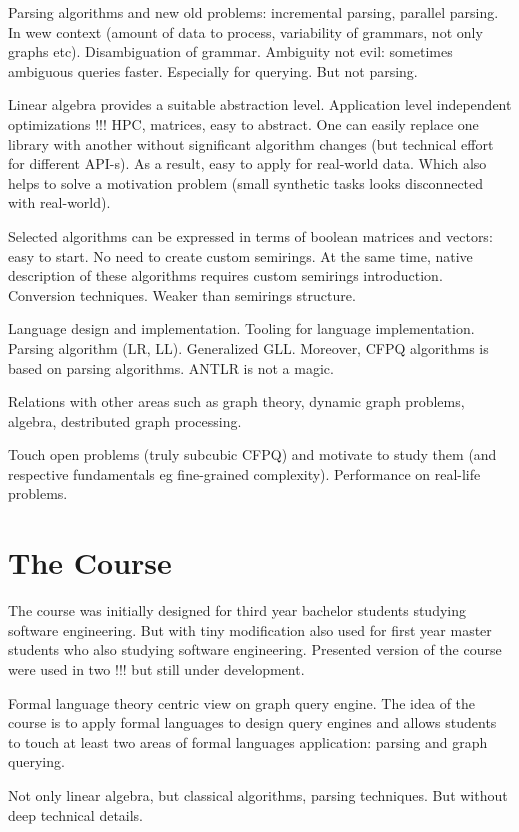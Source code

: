 \documentclass[sigconf]{acmart}
\begin{document}
Parsing algorithms and new old problems: incremental parsing, parallel parsing. In wew context (amount of data to process, variability of grammars, not only graphs etc).
Disambiguation of grammar.
Ambiguity not evil: sometimes ambiguous queries faster.
Especially for querying.
But not parsing.

Linear algebra provides a suitable abstraction level. Application level independent optimizations !!! HPC, matrices, easy to abstract.
One can easily replace one library with another without significant algorithm changes (but technical effort for different API-s).
As a result, easy to apply for real-world data.
Which also helps to solve a motivation problem (small synthetic tasks looks disconnected with real-world).

Selected algorithms can be expressed in terms of boolean matrices and vectors: easy to start.
No need to create custom semirings.
At the same time, native description of these algorithms requires custom semirings introduction.
Conversion techniques.
Weaker than semirings structure. 

Language design and implementation. 
Tooling for language implementation.
Parsing algorithm (LR, LL).
Generalized GLL. 
Moreover, CFPQ algorithms is based on parsing algorithms.
ANTLR is not a magic. 

Relations with other areas such as graph theory, dynamic graph problems, algebra, destributed graph processing.

Touch open problems (truly subcubic CFPQ) and motivate to study them (and respective fundamentals eg fine-grained complexity).
Performance on real-life problems.

\section{The Course}

The course was initially designed for third year bachelor students studying software engineering.
But with tiny modification also used for first year master students who also studying software engineering.
Presented version of the course were used in two !!! but still under development.


Formal language theory centric view on graph query engine.
The idea of the course is to apply formal languages to design query engines and allows students to touch at least two areas of formal languages application: parsing and graph querying.

Not only linear algebra, but classical algorithms, parsing techniques.
But without deep technical details.
\end{document}
